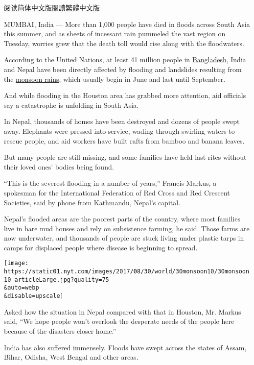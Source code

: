 \href{https://cn.nytimes.com/world/20170830/floods-south-asia-india-bangladesh-nepal-houston/}{阅读简体中文版}\href{https://cn.nytimes.com/world/20170830/floods-south-asia-india-bangladesh-nepal-houston/zh-hant/}{閱讀繁體中文版}

MUMBAI, India --- More than 1,000 people have died in floods across
South Asia this summer, and as sheets of incessant rain pummeled the
vast region on Tuesday, worries grew that the death toll would rise
along with the floodwaters.

According to the United Nations, at least 41 million people in
\href{https://www.nytimes.com/2020/07/30/climate/bangladesh-floods.html}{Bangladesh},
India and Nepal have been directly affected by flooding and landslides
resulting from the
\href{https://www.nytimes.com/2020/07/15/world/asia/monsoon-asia-bangladesh-india.html}{monsoon
rains}, which usually begin in June and last until September.

And while flooding in the Houston area has grabbed more attention, aid
officials say a catastrophe is unfolding in South Asia.

In Nepal, thousands of homes have been destroyed and dozens of people
swept away. Elephants were pressed into service, wading through swirling
waters to rescue people, and aid workers have built rafts from bamboo
and banana leaves.

But many people are still missing, and some families have held last
rites without their loved ones' bodies being found.

``This is the severest flooding in a number of years,'' Francis Markus,
a spokesman for the International Federation of Red Cross and Red
Crescent Societies, said by phone from Kathmandu, Nepal's capital.

Nepal's flooded areas are the poorest parts of the country, where most
families live in bare mud houses and rely on subsistence farming, he
said. Those farms are now underwater, and thousands of people are stuck
living under plastic tarps in camps for displaced people where disease
is beginning to spread.

\texttt{[image: https://static01.nyt.com/images/2017/08/30/world/30monsoon10/30monsoon10-articleLarge.jpg?quality=75\\\&auto=webp\\\&disable=upscale]}

Asked how the situation in Nepal compared with that in Houston, Mr.
Markus said, ``We hope people won't overlook the desperate needs of the
people here because of the disasters closer home.''

India has also suffered immensely. Floods have swept across the states
of Assam, Bihar, Odisha, West Bengal and other areas.

